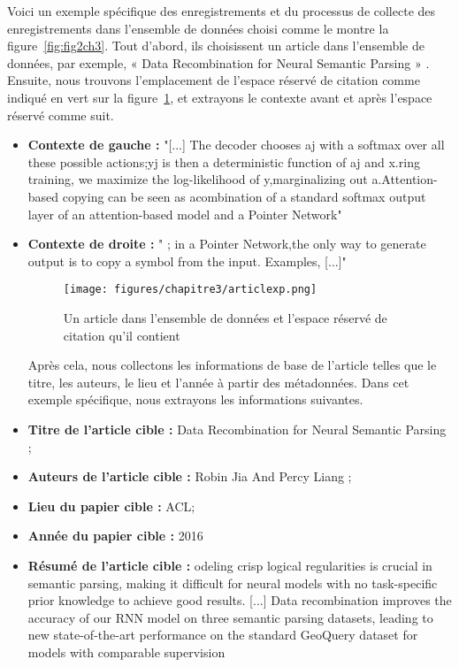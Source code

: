         \par Voici un exemple spécifique des enregistrements et du processus de collecte des enregistrements dans l'ensemble de données choisi comme le montre la figure~\ref{fig:fig2ch3}. Tout d'abord, ils choisissent un article dans l'ensemble de données, par exemple, « Data Recombination for Neural Semantic Parsing » \cite{ch3articlexmple}. Ensuite, nous trouvons l'emplacement de l'espace réservé de citation comme indiqué en vert sur la figure~\ref{fig:artexp}, et extrayons le contexte avant et après l'espace réservé comme suit.
    
        \begin{itemize}[label=•] %
        \setlength{\itemsep}{5pt}
            \item   \textbf{Contexte de gauche :} "[...] The decoder chooses aj with a softmax over all these possible actions;yj is then a deterministic function of aj and x.ring training, we maximize the log-likelihood of y,marginalizing out a.Attention-based copying can be seen as acombination of a standard softmax output layer of an attention-based model and a Pointer Network"
            \item   \textbf{Contexte de droite :} " ; in a Pointer Network,the only way to generate output is to copy a symbol from the input. Examples, [...]"
    
        \begin{figure}[H]
        	\begin{center}
        		\texttt{[image: figures/chapitre3/articlexp.png]}
        	\end{center}
        	\caption {Un article dans l'ensemble de données et l'espace réservé de citation qu'il contient}
        	\label{fig:artexp}
        \end{figure} 
        
        \par Après cela, nous collectons les informations de base de l'article telles que le titre, les auteurs, le lieu et l'année à partir des métadonnées. Dans cet exemple spécifique, nous extrayons les informations suivantes.
    
            \item   \textbf{Titre de l'article cible :} Data Recombination for Neural Semantic Parsing ;
            \item   \textbf{Auteurs de l'article cible :} Robin Jia And Percy Liang ;
            \item   \textbf{Lieu du papier cible :} ACL;
            \item   \textbf{Année du papier cible : } 2016
            \item   \textbf{Résumé de l'article cible :} odeling crisp logical regularities is crucial in semantic parsing, making it difficult for neural models with no task-specific prior knowledge to achieve good results. [...]  Data recombination improves the accuracy of our RNN model on three semantic parsing datasets, leading to new state-of-the-art performance on the standard GeoQuery dataset for models with comparable supervision
    

\end{itemize}
